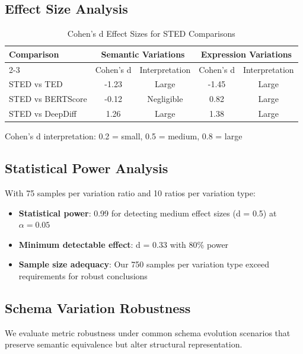 \documentclass{article}
\begin{document}
\subsection{Effect Size Analysis}

\begin{table}[H]
\centering
\caption{Cohen's d Effect Sizes for STED Comparisons}
\label{tab:effect-sizes}
\begin{tabular}{lcccc}
\toprule
\textbf{Comparison} & \multicolumn{2}{c}{\textbf{Semantic Variations}} & \multicolumn{2}{c}{\textbf{Expression Variations}} \\
\cmidrule{2-3} \cmidrule{4-5}
& Cohen's d & Interpretation & Cohen's d & Interpretation \\
\midrule
STED vs TED & -1.23 & Large & -1.45 & Large \\
STED vs BERTScore & -0.12 & Negligible & 0.82 & Large \\
STED vs DeepDiff & 1.26 & Large & 1.38 & Large \\
\bottomrule
\end{tabular}
\vspace{0.3em}
\small{Cohen's d interpretation: 0.2 = small, 0.5 = medium, 0.8 = large}
\end{table}

\subsection{Statistical Power Analysis}

With 75 samples per variation ratio and 10 ratios per variation type:
\begin{itemize}
\item \textbf{Statistical power}: 0.99 for detecting medium effect sizes (d = 0.5) at $\alpha = 0.05$
\item \textbf{Minimum detectable effect}: d = 0.33 with 80\% power
\item \textbf{Sample size adequacy}: Our 750 samples per variation type exceed requirements for robust conclusions
\end{itemize}

\subsection{Schema Variation Robustness}

We evaluate metric robustness under common schema evolution scenarios that preserve semantic equivalence but alter structural representation.
\end{document}
